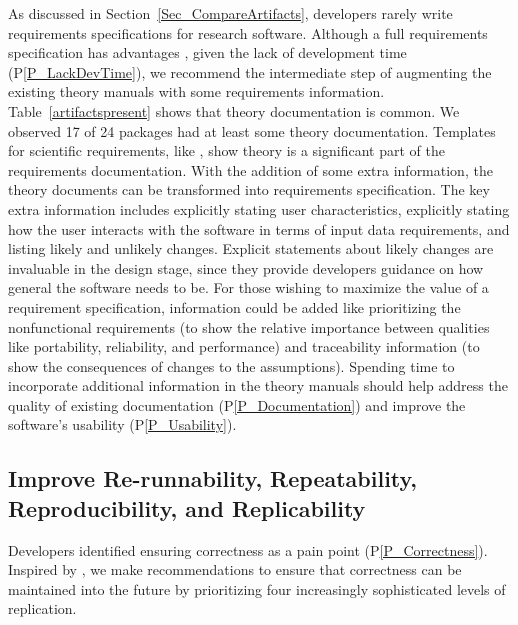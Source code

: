 \documentclass[final, 3p, times, authoryear]{elsarticle}
\newcommand{\ppref}[1]{P\ref{#1}}
\begin{document}
As discussed in Section~\ref{Sec_CompareArtifacts}, developers rarely write requirements specifications for research software. Although a full requirements
specification has advantages \citep{SmithEtAl2007, SmithAndLai2005},
given the lack of development time (\ppref{P_LackDevTime}), we recommend the
intermediate step of augmenting the existing theory manuals with some
requirements information.  Table~\ref{artifactspresent} shows that theory
documentation is common.  We observed 17 of 24 packages had at least some theory
documentation. Templates for scientific requirements, like \citet{SmithEtAl2007,
SmithAndLai2005}, show theory is a significant part of the requirements
documentation. With the addition of some extra information, the theory documents
can be transformed into requirements specification.  The key extra information
includes explicitly stating user characteristics, explicitly stating how the
user interacts with the software in terms of input data requirements, and
listing likely and unlikely changes.  Explicit statements about likely changes
are invaluable in the design stage, since they provide developers guidance on
how general the software needs to be.  For those wishing to maximize the value
of a requirement specification, information could be added like prioritizing the
nonfunctional requirements (to show the relative importance between qualities
like portability, reliability, and performance) and traceability information (to
show the consequences of changes to the assumptions). Spending time to
incorporate additional information in the theory manuals should help address the
quality of existing documentation (\ppref{P_Documentation})  and improve the
software's usability (\ppref{P_Usability}).

\subsection{Improve Re-runnability, Repeatability, Reproducibility, and Replicability} 
\label{Sec_Reproducibility}

Developers identified ensuring correctness as a pain point
(\ppref{P_Correctness}).  Inspired by \citet{BenureauAndRougier2017}, we make
recommendations to ensure that correctness can be maintained into the future by
prioritizing four increasingly sophisticated levels of replication.
\end{document}
